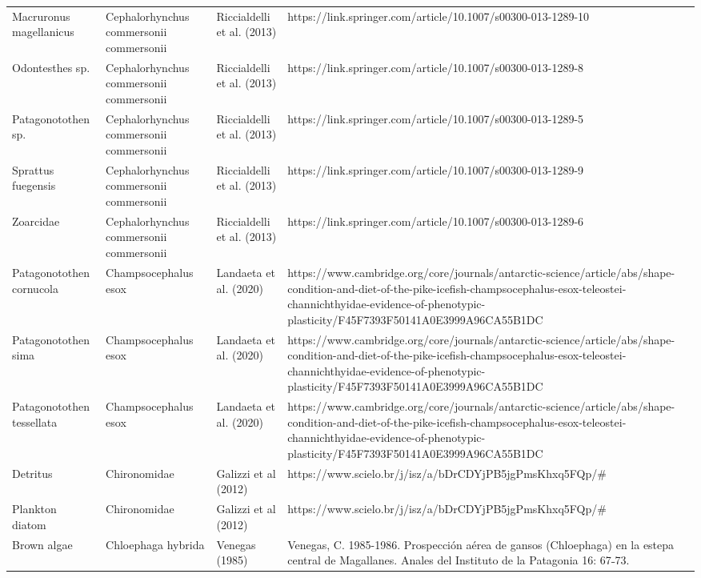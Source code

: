 \documentclass[
]{article}
\begin{document}
\begin{landscape}
\begin{longtable}[t]{>{\raggedright\arraybackslash}p{4cm}>{\centering\arraybackslash}p{4cm}>{\centering\arraybackslash}p{6cm}>{\centering\arraybackslash}p{6cm}}
Macruronus magellanicus & Cephalorhynchus commersonii commersonii & \tiny Riccialdelli et al. (2013) & \tiny https://link.springer.com/article/10.1007/s00300-013-1289-10\\
\addlinespace
Odontesthes sp. & Cephalorhynchus commersonii commersonii & \tiny Riccialdelli et al. (2013) & \tiny https://link.springer.com/article/10.1007/s00300-013-1289-8\\
Patagonotothen sp. & Cephalorhynchus commersonii commersonii & \tiny Riccialdelli et al. (2013) & \tiny https://link.springer.com/article/10.1007/s00300-013-1289-5\\
Sprattus fuegensis & Cephalorhynchus commersonii commersonii & \tiny Riccialdelli et al. (2013) & \tiny https://link.springer.com/article/10.1007/s00300-013-1289-9\\
Zoarcidae & Cephalorhynchus commersonii commersonii & \tiny Riccialdelli et al. (2013) & \tiny https://link.springer.com/article/10.1007/s00300-013-1289-6\\
Patagonotothen cornucola & Champsocephalus esox & \tiny Landaeta et al. (2020) & \tiny https://www.cambridge.org/core/journals/antarctic-science/article/abs/shape-condition-and-diet-of-the-pike-icefish-champsocephalus-esox-teleostei-channichthyidae-evidence-of-phenotypic-plasticity/F45F7393F50141A0E3999A96CA55B1DC\\
\addlinespace
Patagonotothen sima & Champsocephalus esox & \tiny Landaeta et al. (2020) & \tiny https://www.cambridge.org/core/journals/antarctic-science/article/abs/shape-condition-and-diet-of-the-pike-icefish-champsocephalus-esox-teleostei-channichthyidae-evidence-of-phenotypic-plasticity/F45F7393F50141A0E3999A96CA55B1DC\\
Patagonotothen tessellata & Champsocephalus esox & \tiny Landaeta et al. (2020) & \tiny https://www.cambridge.org/core/journals/antarctic-science/article/abs/shape-condition-and-diet-of-the-pike-icefish-champsocephalus-esox-teleostei-channichthyidae-evidence-of-phenotypic-plasticity/F45F7393F50141A0E3999A96CA55B1DC\\
Detritus & Chironomidae & \tiny Galizzi et al (2012) & \tiny https://www.scielo.br/j/isz/a/bDrCDYjPB5jgPmsKhxq5FQp/#\\
Plankton diatom & Chironomidae & \tiny Galizzi et al (2012) & \tiny https://www.scielo.br/j/isz/a/bDrCDYjPB5jgPmsKhxq5FQp/#\\
Brown algae & Chloephaga hybrida & \tiny Venegas (1985) & \tiny Venegas, C. 1985-1986. Prospección aérea de gansos (Chloephaga) en la estepa central de Magallanes. Anales del Instituto de la Patagonia 16: 67˗73.\\

\end{longtable}
\end{landscape}
\end{document}
